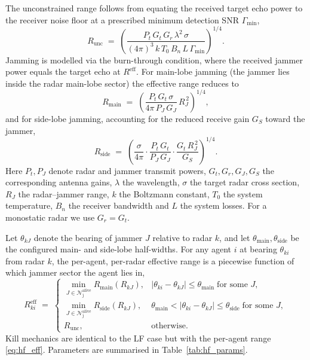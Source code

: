 The unconstrained range follows from equating the received target echo power
to the receiver noise floor at a prescribed minimum detection SNR $\Gamma_{\min}$,
\begin{equation}
R_{\mathrm{unc}} \;=\;
\left(
\frac{P_t\,G_t\,G_r\,\lambda^{2}\,\sigma}
     {(4\pi)^{3}\, k\, T_{0}\, B_n\, L\, \Gamma_{\min}}
\right)^{1/4}.
\label{eq:R_unc}
\end{equation}
Jamming is modelled via the burn-through condition, where the received
jammer power equals the target echo at $R^{\mathrm{eff}}$. For main-lobe
jamming (the jammer lies inside the radar main-lobe sector) the effective
range reduces to
\begin{equation}
R_{\mathrm{main}} \;=\;
\left(
\frac{P_t\,G_t\,\sigma}{4\pi\,P_J\,G_J}\,R_{J}^{\,2}
\right)^{1/4},
\label{eq:R_main}
\end{equation}
and for side-lobe jamming, accounting for the reduced receive gain $G_{S}$
toward the jammer,
\begin{equation}
R_{\mathrm{side}} \;=\;
\left(
\frac{\sigma}{4\pi}\cdot
\frac{P_t\,G_t}{P_J\,G_J}\cdot
\frac{G_t\,R_{J}^{\,2}}{G_{S}}
\right)^{1/4}.
\label{eq:R_side}
\end{equation}
Here $P_t,P_J$ denote radar and jammer transmit powers, $G_t,G_r,G_J,G_{S}$
the corresponding antenna gains, $\lambda$ the wavelength, $\sigma$ the target
radar cross section, $R_J$ the radar--jammer range, $k$ the Boltzmann
constant, $T_0$ the system temperature, $B_n$ the receiver bandwidth and
$L$ the system losses. For a monostatic radar we use $G_r=G_t$.

Let $\theta_{kJ}$ denote the bearing of jammer $J$ relative to radar $k$, and
let $\theta_{\mathrm{main}},\theta_{\mathrm{side}}$ be the configured
main- and side-lobe half-widths. For any agent $i$ at bearing $\theta_{ki}$
from radar $k$, the per-agent, per-radar effective range is a piecewise
function of which jammer sector the agent lies in,
\begin{equation}
R^{\mathrm{eff}}_{ki} \;=\;
\begin{cases}
\min_{J\in\mathcal{N}_{\mathrm{j}}^{\mathrm{alive}}} R_{\mathrm{main}}(R_{kJ}), &
|\theta_{ki}-\theta_{kJ}|\le \theta_{\mathrm{main}} \;\text{for some }J,\\[2pt]
\min_{J\in\mathcal{N}_{\mathrm{j}}^{\mathrm{alive}}} R_{\mathrm{side}}(R_{kJ}), &
\theta_{\mathrm{main}} < |\theta_{ki}-\theta_{kJ}|\le \theta_{\mathrm{side}}
\;\text{for some }J,\\[2pt]
R_{\mathrm{unc}}, & \text{otherwise.}
\end{cases}
\label{eq:hf_eff}
\end{equation}
Kill mechanics are identical to the LF case but with the per-agent range
\eqref{eq:hf_eff}. Parameters are summarised in Table~\ref{tab:hf_params}.


